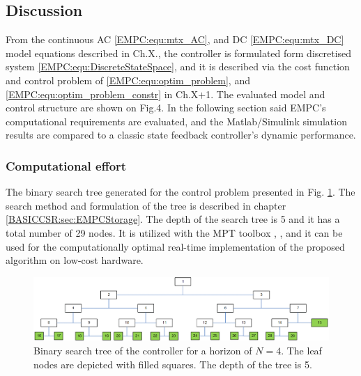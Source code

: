 \subsection{Discussion}\label{EMPC:sec:Discussion}

    From the continuous AC \ref{EMPC:equ:mtx_AC}, and DC \ref{EMPC:equ:mtx_DC} model equations described in Ch.X., the controller is formulated form discretised system \ref{EMPC:equ:DiscreteStateSpace}, and it is described via the cost function and control problem of \ref{EMPC:equ:optim_problem}, and \ref{EMPC:equ:optim_problem_constr} in Ch.X$+$1. The evaluated model and control structure are shown on Fig.4. In the following section said EMPC’s computational requirements are evaluated, and the Matlab/Simulink simulation results are compared to a classic state feedback controller’s dynamic performance.

    \subsubsection{Computational effort}\label{EMPC:sec:CompEffort}

    The binary search tree generated for the control problem presented in Fig. \ref{EMPC:fig:SearchTree}. The search method and formulation of the tree is described in chapter \ref{BASICCSR:sec:EMPCStorage}. The depth of the search tree is 5 and it has a total number of 29 nodes. It is utilized with the MPT toolbox \cite{muthukumar2016adaptive}, \cite{kutasi2010constrained}, and it can be used for the computationally optimal real-time implementation of the proposed algorithm on low-cost hardware.

    \begin{figure}[!ht]
        \centering
        \includegraphics[width=\textwidth]{EMPC_PNG_Pics/SearchTree.png}
        \caption{Binary search tree of the controller for a horizon of $N = 4$. The leaf nodes are depicted with filled squares. The depth of the tree is 5.}
        \label{EMPC:fig:SearchTree}
    \end{figure}

